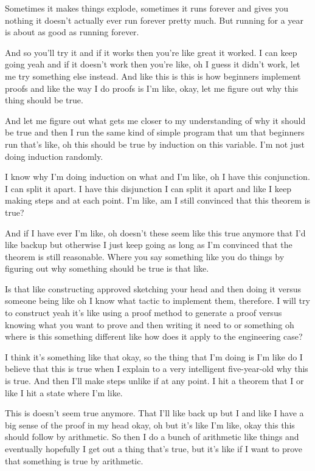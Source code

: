 \begin{subappendices}
Sometimes it makes things explode, sometimes it runs forever and gives you nothing it doesn't actually ever run forever pretty much. But running for a year is about as good as running forever.

And so you'll try it and if it works then you're like great it worked. I can keep going yeah and if it doesn't work then you're like, oh I guess it didn't work, let me try something else instead. And like this is this is how beginners implement proofs and like the way I do proofs is I'm like, okay, let me figure out why this thing should be true.

And let me figure out what gets me closer to my understanding of why it should be true and then I run the same kind of simple program that um that beginners run that's like, oh this should be true by induction on this variable. I'm not just doing induction randomly.

I know why I'm doing induction on what and I'm like, oh I have this conjunction. I can split it apart. I have this disjunction I can split it apart and like I keep making steps and at each point. I'm like, am I still convinced that this theorem is true?

And if I have ever I'm like, oh doesn't these seem like this true anymore that I'd like backup but otherwise I just keep going as long as I'm convinced that the theorem is still reasonable. Where you say something like you do things by figuring out why something should be true is that like.

Is that like constructing approved sketching your head and then doing it versus someone being like oh I know what tactic to implement them, therefore. I will try to construct yeah it's like using a proof method to generate a proof versus knowing what you want to prove and then writing it need to or something oh where is this something different like how does it apply to the engineering case?

I think it's something like that okay, so the thing that I'm doing is I'm like do I believe that this is true when I explain to a very intelligent five-year-old why this is true. And then I'll make steps unlike if at any point. I hit a theorem that I or like I hit a state where I'm like.

This is doesn't seem true anymore. That I'll like back up but I and like I have a big sense of the proof in my head okay, oh but it's like I'm like, okay this this should follow by arithmetic. So then I do a bunch of arithmetic like things and eventually hopefully I get out a thing that's true, but it's like if I want to prove that something is true by arithmetic.


\end{subappendices}
